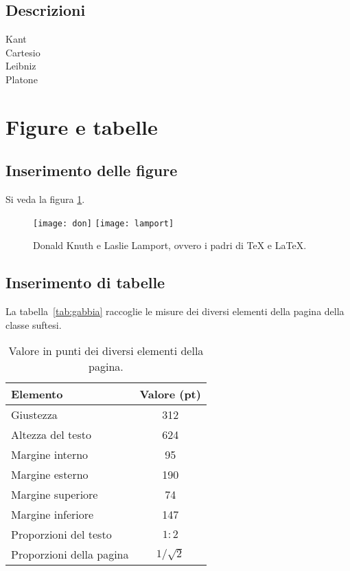 \subsection{Descrizioni} 
\begin{description}
 \item[Kant]
 \item[Cartesio]
 \item[Leibniz]
 \item[Platone]
 \end{description}
 
  
 \section{Figure e tabelle}

\subsection{Inserimento delle figure}

Si veda la figura \ref{fig:knuth-lamport}.
\begin{figure}[h]
\centering
\texttt{[image: don]}
\quad
\texttt{[image: lamport]}
\caption[Donald Knuth e Laslie Lamport]{Donald Knuth e Laslie Lamport, ovvero i padri di \TeX{} e \LaTeX.}
\label{fig:knuth-lamport}
\end{figure}


\subsection{Inserimento di tabelle}

La tabella~\vref{tab:gabbia} raccoglie le misure dei diversi elementi
della pagina della classe \textsf{suftesi}.
\begin{table}[h]
\centering
\begin{tabular}{lc}
\toprule
Elemento                 & Valore (pt)\\\midrule
Giustezza                & 312 \\
Altezza del testo        & 624 \\
Margine interno          & 95 \\
Margine esterno          & 190 \\
Margine superiore        & 74 \\
Margine inferiore        & 147 \\
Proporzioni del testo    & $1:2$\\
Proporzioni della pagina & $1/\sqrt{2}$\\
\bottomrule
\end{tabular}
\caption[Misure degli elementi della pagina]{Valore in punti dei diversi elementi della pagina.}
\label{tab:gabbia}
\end{table}
 